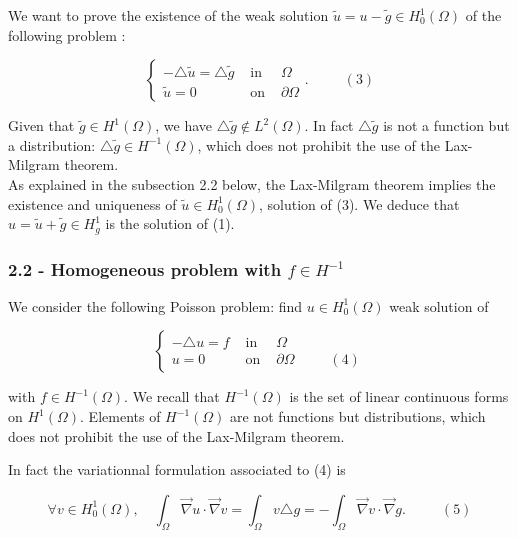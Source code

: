 \documentclass[11pt]{article}
\begin{document}
We want to prove the existence of the weak solution
\(\tilde u=u-\tilde g\in H^1_0(\Omega)\) of the following problem :

\[
\left\{\begin{array}{ccc}
-\triangle \tilde u=\triangle \tilde g &\textrm{ in }& \Omega\\[1.5ex]
\tilde u=0 &\textrm{ on } &\partial \Omega        
       \end{array}
\right.. \;\;\;\;\;\;\;\;\;(3)
\]

Given that \(\tilde g\in H^{1}(\Omega)\), we have
\(\triangle \tilde g \notin L^2(\Omega)\). In fact
\(\triangle \tilde g\) is not a function but a distribution:
\(\triangle \tilde g \in H^{-1}(\Omega)\), which does not prohibit the
use of the Lax-Milgram theorem.\\
As explained in the subsection 2.2 below, the Lax-Milgram theorem
implies the existence and uniqueness of \(\tilde u\in H^1_0(\Omega)\),
solution of (3). We deduce that \(u=\tilde u+\tilde g\in H^1_g\) is the
solution of (1).

\hypertarget{homogeneous-problem-with-fin-h-1}{%
\subsubsection{\texorpdfstring{2.2 - Homogeneous problem with
\(f\in H^{-1}\)}{2.2 - Homogeneous problem with f\textbackslash{}in H\^{}\{-1\}}}\label{homogeneous-problem-with-fin-h-1}}

We consider the following Poisson problem: find \(u\in H^1_0(\Omega)\)
weak solution of

\[
\left\{\begin{array}{ccc}
-\triangle u= f &\textrm{ in }& \Omega\\ 
u=0 &\textrm{ on } &\partial \Omega   \;\;\;\;\;\;\;\;\;(4)      
       \end{array}
\right.
\]

with \(f\in H^{-1}(\Omega)\). We recall that \(H^{-1}(\Omega)\) is the
set of linear continuous forms on \(H^{1}(\Omega)\). Elements of
\(H^{-1}(\Omega)\) are not functions but distributions, which does not
prohibit the use of the Lax-Milgram theorem.

In fact the variationnal formulation associated to (4) is

\[
\forall v\in H^1_0(\Omega),\quad \int_\Omega \vec\nabla u\cdot\vec\nabla v =\int_\Omega v\triangle g = - \int_{\Omega}\vec\nabla v\cdot\vec \nabla g.\;\;\;\;\;\;\;\;\;(5)
\]
\end{document}
